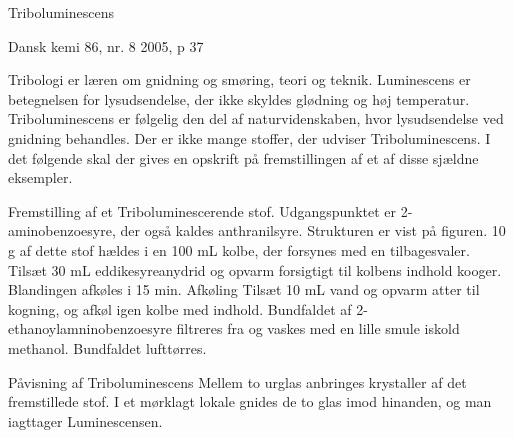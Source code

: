 \documentclass{article}
\begin{document}
Triboluminescens

Dansk kemi 86, nr. 8 2005, p 37

Tribologi er læren om gnidning og smøring, teori og teknik. Luminescens er betegnelsen for lysudsendelse, der ikke skyldes glødning og høj temperatur. Triboluminescens er følgelig den del af naturvidenskaben, hvor lysudsendelse ved gnidning behandles.
Der er ikke mange stoffer, der udviser Triboluminescens. I det følgende skal der gives en opskrift på fremstillingen af et af disse sjældne eksempler.

Fremstilling af et Triboluminescerende stof.
Udgangspunktet er 2-aminobenzoesyre, der også kaldes anthranilsyre. Strukturen er vist på figuren. 10 g af dette stof hældes i en 100 mL kolbe, der forsynes med en tilbagesvaler.
Tilsæt 30 mL eddikesyreanydrid og opvarm forsigtigt til kolbens indhold kooger.
Blandingen afkøles i 15 min.
Afkøling
Tilsæt 10 mL vand og opvarm atter til kogning, og afkøl igen kolbe med indhold.
Bundfaldet af 2-ethanoylamninobenzoesyre filtreres fra og vaskes med en lille smule iskold methanol.
Bundfaldet lufttørres.

Påvisning af Triboluminescens
Mellem to urglas anbringes krystaller af det fremstillede stof. I et mørklagt lokale gnides de to glas imod hinanden, og man iagttager Luminescensen.


\end{document}
